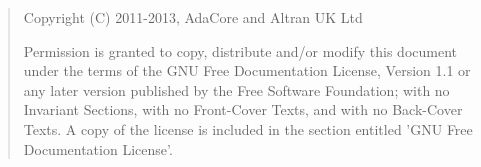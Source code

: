 \bigskip
\begin{quote}
   Copyright (C) 2011-2013, AdaCore and Altran UK Ltd

   Permission is granted to copy, distribute and/or modify this document
   under the terms of the GNU Free Documentation License, Version 1.1
   or any later version published by the Free Software Foundation;
   with no Invariant Sections, with no Front-Cover Texts, and with no
   Back-Cover Texts.
   A copy of the license is included in the section entitled 'GNU
   Free Documentation License'.
\end{quote}
\bigskip

